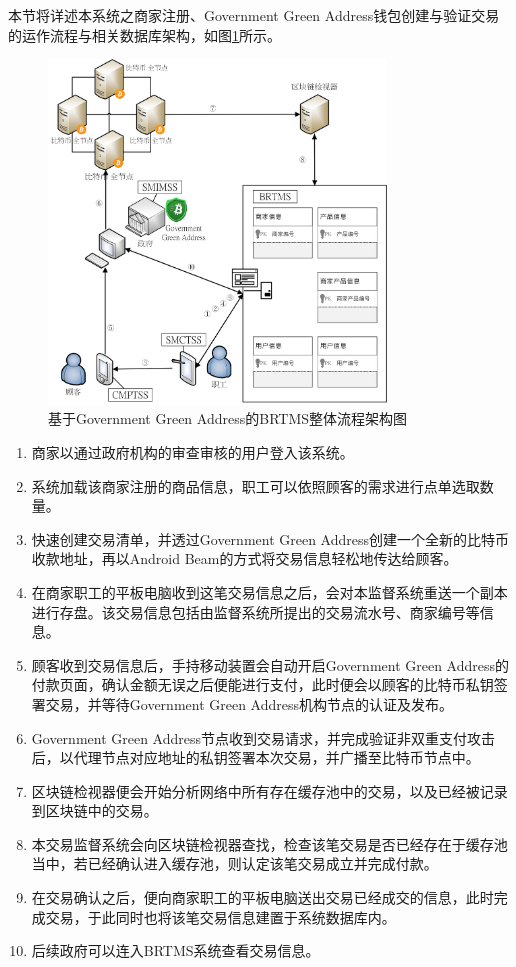本节将详述本系统之商家注册、Government Green Address钱包创建与验证交易的运作流程与相关数据库架构，如图\ref{gabpcss}所示。

	\begin{figure}[!htbp]
		\centering
		\includegraphics[width = 0.8\textwidth]{gabpcss.jpg}
		\caption{基于Government Green Address的BRTMS整体流程架构图}\label{gabpcss}
	\end{figure}

	\begin{enumerate}
		\item 商家以通过政府机构的审查审核的用户登入该系统。
		\item 系统加载该商家注册的商品信息，职工可以依照顾客的需求进行点单选取数量。
		\item 快速创建交易清单，并透过Government Green Address创建一个全新的比特币收款地址，再以Android Beam的方式将交易信息轻松地传达给顾客。
		\item 在商家职工的平板电脑收到这笔交易信息之后，会对本监督系统重送一个副本进行存盘。该交易信息包括由监督系统所提出的交易流水号、商家编号等信息。
		\item 顾客收到交易信息后，手持移动装置会自动开启Government Green Address的付款页面，确认金额无误之后便能进行支付，此时便会以顾客的比特币私钥签署交易，并等待Government Green Address机构节点的认证及发布。
		\item Government Green Address节点收到交易请求，并完成验证非双重支付攻击后，以代理节点对应地址的私钥签署本次交易，并广播至比特币节点中。
		\item 区块链检视器便会开始分析网络中所有存在缓存池中的交易，以及已经被记录到区块链中的交易。
		\item 本交易监督系统会向区块链检视器查找，检查该笔交易是否已经存在于缓存池当中，若已经确认进入缓存池，则认定该笔交易成立并完成付款。
		\item 在交易确认之后，便向商家职工的平板电脑送出交易已经成交的信息，此时完成交易，于此同时也将该笔交易信息建置于系统数据库内。
		\item 后续政府可以连入BRTMS系统查看交易信息。
	\end{enumerate}